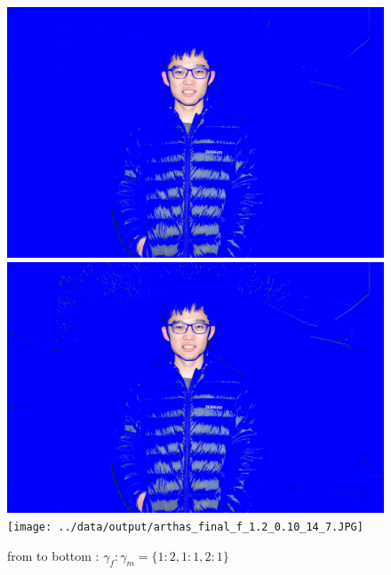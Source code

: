 \documentclass[final]{cvpr}
\begin{document}
\begin{figure}[ht]
   \centering
   \includegraphics[scale=0.03]{../data/output/arthas_final_f_1.2_0.10_7_14.JPG}
   \includegraphics[scale=0.03]{../data/output/arthas_final_f_1.2_0.10_10_10.JPG}
   \texttt{[image: ../data/output/arthas\_final\_f\_1.2\_0.10\_14\_7.JPG]}
   \caption{from to bottom : $ \gamma_f : \gamma_m = \{1:2,1:1,2:1\}$}
\end{figure}
\end{document}
